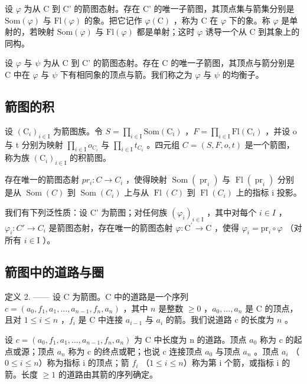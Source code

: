 设 \(\varphi\) 为从 C 到 C' 的箭图态射。存在 C' 的唯一子箭图，其顶点集与箭集分别是 \(\mathrm{Som}(\varphi)\) 与 \(\mathrm{Fl}(\varphi)\) 的象。把它记作 \(\varphi(\mathrm{C})\) ，称为 C 在 \(\varphi\) 下的象。称 \(\varphi\) 是单射的，若映射 \(\mathrm{Som}(\varphi)\) 与 \(\mathrm{Fl}(\varphi)\) 都是单射；这时 \(\varphi\) 诱导一个从 C 到其象上的同构。

设 \(\varphi\) 与 \(\psi\) 为从 C 到 C' 的箭图态射。存在 C 的唯一子箭图，其顶点与箭分别是 C 中在 \(\varphi\) 与 \(\psi\) 下有相同象的顶点与箭。我们称之为 \(\varphi\) 与 \(\psi\) 的均衡子。

\subsection{箭图的积}

设 \((\mathrm{C}_{i})_{i\in\mathrm{I}}\) 为箭图族。令 \(S = \prod_{i\in\mathrm{I}} \mathrm{Som}(\mathrm{C}_{i})\) ，\(F = \prod_{i\in\mathrm{I}} \mathrm{Fl}(\mathrm{C}_{i})\) ，并设 o 与 t 分别为映射 \(\prod_{i\in\mathrm{I}} o_{C_{i}}\) 与 \(\prod_{i\in\mathrm{I}} t_{C_{i}}\) 。四元组 \(C = (S, F, o, t)\) 是一个箭图，称为族 \((\mathrm{C}_{i})_{i\in\mathrm{I}}\) 的积箭图。

存在唯一的箭图态射 \(pr_{i}: C \to C_{i}\) ，使得映射 \(\operatorname{Som}(\operatorname{pr}_{i})\) 与 \(\operatorname{Fl}(\operatorname{pr}_{i})\) 分别是从 \(\operatorname{Som}(C)\) 到 \(\operatorname{Som}(C_{i})\) 上与从 \(\operatorname{Fl}(C)\) 到 \(\operatorname{Fl}(C_{i})\) 上的指标 i 投影。

我们有下列泛性质：设 C' 为箭图；对任何族 \((\varphi_{i})_{i\in\mathrm{I}}\) ，其中对每个 \(i\in I\) ，\(\varphi_{i}\colon C'\to C_{i}\) 是箭图态射，存在唯一的箭图态射 \(\varphi\colon\mathrm{C}^{\prime}\to\mathrm{C}\) ，使得 \(\varphi_{i}=\mathrm{pr}_{i}\circ\varphi\) （对所有 \(i\in\mathrm{I}\) ）。

\subsection{箭图中的道路与圈}

定义 2. —— 设 C 为箭图。C 中的道路是一个序列 \(c = (a_{0}, f_{1}, a_{1}, \ldots, a_{n-1}, f_{n}, a_{n})\) ，其中 \(n\) 是整数 \(\geqslant 0\) ，\(a_{0}, \ldots, a_{n}\) 是 C 的顶点，且对 \(1 \leqslant i \leqslant n\) ，\(f_{i}\) 是 C 中连接 \(a_{i-1}\) 与 \(a_{i}\) 的箭。我们说道路 c 的长度为 \(n\) 。

设 \(c = (a_{0}, f_{1}, a_{1}, \ldots, a_{n-1}, f_{n}, a_{n})\) 为 C 中长度为 n 的道路。顶点 \(a_{0}\) 称为 c 的起点或源；顶点 \(a_{n}\) 称为 c 的终点或靶；也说 c 连接顶点 \(a_{0}\) 与顶点 \(a_{n}\) 。顶点 \(a_{i}\) （\(0 \leqslant i \leqslant n\)）称为指标 i 的顶点；箭 \(f_{i}\) （\(1 \leqslant i \leqslant n\)）称为第 i 个箭，或指标 i 的箭。长度 \(\geqslant 1\) 的道路由其箭的序列确定。

